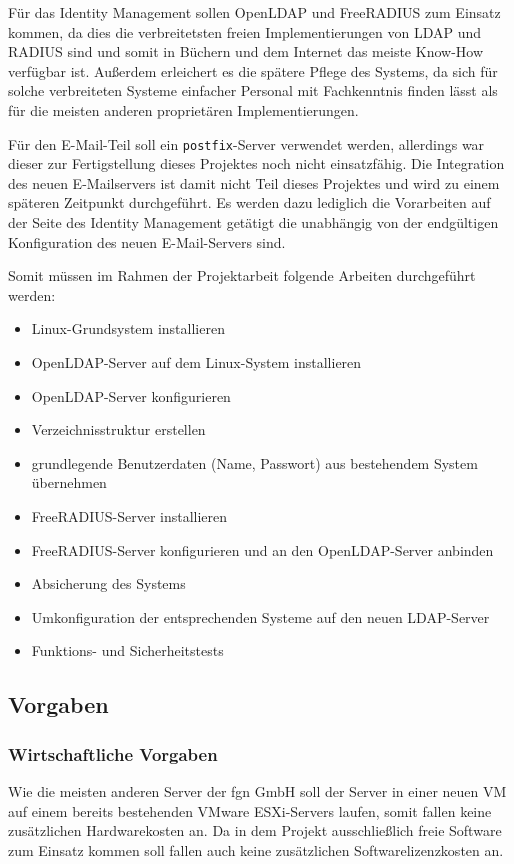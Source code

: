 \documentclass[11pt,a4paper,titlepage=firstiscover,headsepline]{scrartcl} %
\begin{document}
Für das Identity Management sollen OpenLDAP und FreeRADIUS zum Einsatz kommen, da dies die verbreitetsten freien Implementierungen von LDAP und RADIUS sind und somit in Büchern und dem Internet das meiste Know-How verfügbar ist. Außerdem erleichert es die spätere Pflege des Systems, da sich für solche verbreiteten Systeme einfacher Personal mit Fachkenntnis finden lässt als für die meisten anderen proprietären Implementierungen.

Für den E-Mail-Teil soll ein \texttt{postfix}-Server verwendet werden, allerdings war dieser zur Fertigstellung dieses Projektes noch nicht einsatzfähig. Die Integration des neuen E-Mailservers ist damit nicht Teil dieses Projektes und wird zu einem späteren Zeitpunkt durchgeführt. Es werden dazu lediglich die Vorarbeiten auf der Seite des Identity Management getätigt die unabhängig von der endgültigen Konfiguration des neuen E-Mail-Servers sind.

\medskip \noindent 		%
Somit müssen im Rahmen der Projektarbeit folgende Arbeiten durchgeführt werden: 
\begin{itemize}
\item Linux-Grundsystem installieren
\item OpenLDAP-Server auf dem Linux-System installieren
\item OpenLDAP-Server konfigurieren
\item Verzeichnisstruktur erstellen
\item grundlegende Benutzerdaten (Name, Passwort) aus bestehendem System übernehmen
\item FreeRADIUS-Server installieren
\item FreeRADIUS-Server konfigurieren und an den OpenLDAP-Server anbinden
\item Absicherung des Systems
\item Umkonfiguration der entsprechenden Systeme auf den neuen LDAP-Server
\item Funktions- und Sicherheitstests
\end{itemize}


\subsection{Vorgaben}
\subsubsection{Wirtschaftliche Vorgaben}
Wie die meisten anderen Server der fgn GmbH soll der Server in einer neuen VM auf einem bereits bestehenden VMware ESXi-Servers laufen, somit fallen keine zusätzlichen Hardwarekosten an. Da in dem Projekt  ausschließlich freie Software zum Einsatz kommen soll fallen auch keine zusätzlichen Softwarelizenzkosten an.
\end{document}
